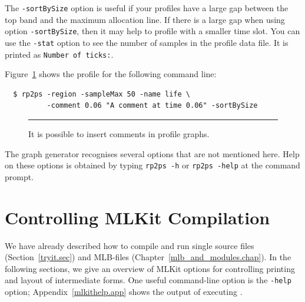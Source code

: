 \documentclass[12pt]{book}
\begin{document}
The \texttt{-sortBySize} option is useful if your profiles have a
large gap between the top band and the maximum allocation line.  If
there is a large gap when using option \texttt{-sortBySize}, then it
may help to profile with a smaller time slot. You can use the
%
{\tt -stat} option to see the number of samples in the profile data
file. It is printed as \texttt{Number of ticks:}.

Figure~\ref{prof_eks4.fig} shows the profile for the following
command line:
\begin{verbatim}
  $ rp2ps -region -sampleMax 50 -name life \
          -comment 0.06 "A comment at time 0.06" -sortBySize
\end{verbatim}

\begin{figure}
\caption{It is possible to insert comments in profile graphs.}
\label{prof_eks4.fig}
\medskip\hrule
\end{figure}

The graph generator recognises several options that are not mentioned
here. Help on these options is obtained by typing \texttt{rp2ps -h} or
\index{help@\texttt{-help} option}%
{\tt rp2ps -help} at the command prompt.
%

\chapter{Controlling MLKit Compilation}
\label{controlkit.sec}
\label{startup.sec}

We have already described how to compile and run single source files
(Section~\ref{tryit.sec}) and MLB-files
(Chapter~\ref{mlb_and_modules.chap}).  In the following sections,
we give an overview of MLKit options for controlling printing and
layout of intermediate forms. One useful command-line option is
the
%
{\tt -help} option; Appendix~\ref{mlkithelp.app} shows the output of
executing \boxml{mlkit -help}.



\end{document}
